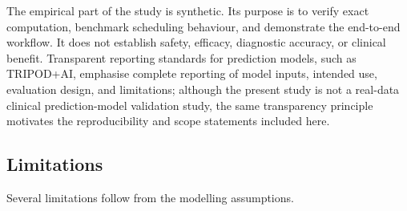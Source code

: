 \documentclass[pdflatex,sn-mathphys-num]{sn-jnl}
\theoremstyle{definition}
\numberwithin{equation}{section}
\begin{document}
The empirical part of the study is synthetic. Its purpose is to verify exact
computation, benchmark scheduling behaviour, and demonstrate the end-to-end
workflow. It does not establish safety, efficacy, diagnostic accuracy, or
clinical benefit. Transparent reporting standards for prediction models, such
as TRIPOD+AI, emphasise complete reporting of model inputs, intended use,
evaluation design, and limitations; although the present study is not a
real-data clinical prediction-model validation study, the same transparency
principle motivates the reproducibility and scope statements included here.

\subsection*{Limitations}

Several limitations follow from the modelling assumptions.
\end{document}
